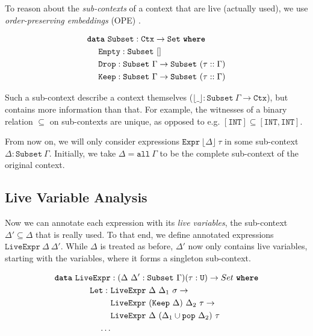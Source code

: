 \documentclass[sigplan,nonacm,screen,review,timestamp]{acmart}
\newcommand{\I}[1]{\texttt{#1}\xspace}
\newcommand{\K}[1]{\textbf{\texttt{#1}}\xspace}
\newcommand{\Floor}[1]{\lfloor #1 \rfloor\xspace}
\begin{document}
To reason about the \emph{sub-contexts} of a context that are live (actually used),
we use \emph{order-preserving embeddings} (OPE) \cite{chapman2009type}.

\begin{align*}
  &\K{data}\ \I{Subset} : \I{Ctx} \to \I{Set}\ \K{where}          \\
  &\ \ \ \ \I{Empty} : \I{Subset}\ []                                    \\
  &\ \ \ \ \I{Drop}  : \I{Subset}\ \Gamma \to \I{Subset}\ (\tau :: \Gamma)  \\
  &\ \ \ \ \I{Keep}  : \I{Subset}\ \Gamma \to \I{Subset}\ (\tau :: \Gamma)
\end{align*}

Such a sub-context describe a context themselves
($\Floor{\_} : \I{Subset}\ \Gamma \to \I{Ctx}$),
but contains more information than that.
For example, the witnesses of a binary relation $\subseteq$ on sub-contexts are unique,
as opposed to e.g. $[\I{INT}] \subseteq [\I{INT}, \I{INT}]$.

From now on, we will only consider expressions
$\I{Expr}\ \Floor{\Delta}\ \tau$ in some sub-context $\Delta : \I{Subset}\ \Gamma$.
Initially, we take $\Delta = \I{all}\ \Gamma$ to be the complete sub-context of the original context.

\subsection{Live Variable Analysis}

Now we can annotate each expression with its \emph{live variables},
the sub-context $\Delta' \subseteq \Delta$ that is really used.
To that end, we define annotated expressions $\I{LiveExpr}\ \Delta\ \Delta'$.
While $\Delta$ is treated as before, $\Delta'$ now only contains live variables,
starting with the variables, where it forms a singleton sub-context.

\begin{align*}
  \K{data}\ \I{LiveExpr}& : (\Delta\ \Delta' : \I{Subset}\ \Gamma) (\tau : \I{U}) \to Set\ \K{where} \\
  \I{Let}
    :\ &\I{LiveExpr}\ \Delta\ \Delta_1\ \sigma \to  \\
       &\I{LiveExpr}\ (\I{Keep}\ \Delta)\ \Delta_2\ \tau \to  \\
       &\I{LiveExpr}\ \Delta\ (\Delta_1 \cup \I{pop}\ \Delta_2)\ \tau \\
  \ldots&
\end{align*}
\end{document}

